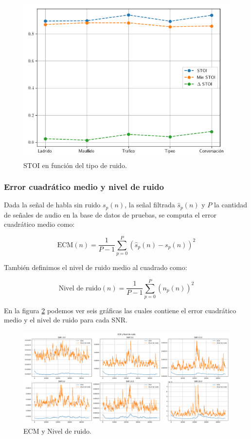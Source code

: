 \begin{figure}
	\centering
	\centerline{\includegraphics[scale=0.75]{images/ch6/af_metric_STOI_noises.png}}
	\caption{STOI en función del tipo de ruido.}
	\label{fig:ch6_stoi_resume_by_noise}
\end{figure} 

\subsubsection{Error cuadrático medio y nivel de ruido}

Dada la señal de habla sin ruido $s_p(n)$, la señal filtrada $\hat{s}_p(n)$ y $P$ la cantidad de señales de audio en la base de datos de pruebas, se computa el error cuadrático medio como:

\begin{equation*}
	\text{ECM}(n) = \frac{1}{P-1} \sum_{p=0}^{P} (\hat{s}_p(n) - s_p(n))^2
\end{equation*}

También definimos el nivel de ruido medio al cuadrado como:

\begin{equation*}
	\text{Nivel de ruido}(n) = \frac{1}{P-1} \sum_{p=0}^{P} (n_p(n))^2
\end{equation*}

En la figura \ref{fig:ch6_mse_and_noise_level} podemos ver seis gráficas las cuales contiene el error cuadrático medio y el nivel de ruido para cada SNR.

\begin{figure}
	\centering
	\centerline{\includegraphics[scale=0.35]{images/ch6/af/mse_and_noise_level.png}}
	\caption{ECM y Nivel de ruido.}
	\label{fig:ch6_mse_and_noise_level}
\end{figure}

